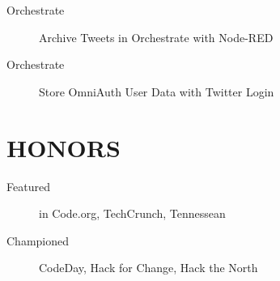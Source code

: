 \documentclass{res}
\begin{document}
\begin{description}
  \item[Orchestrate] Archive Tweets in Orchestrate with Node-RED
  \item[Orchestrate] Store OmniAuth User Data with Twitter Login
\end{description}

\section{HONORS}

\begin{description}
  \item[Featured] in Code.org, TechCrunch, Tennessean
  \item[Championed] CodeDay, Hack for Change, Hack the North
\end{description}
\end{document}
